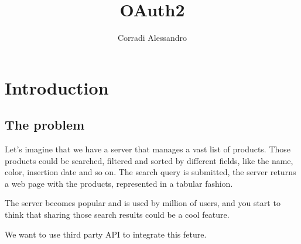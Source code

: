 \documentclass{style}
\title{OAuth2}
\author{Corradi Alessandro}
\begin{document}
\maketitle{}
\tableofcontents
\clearpage
{}

\section{Introduction}
\subsection{The problem}
Let's imagine that we have a server that manages a vast list of products.
Those products could be searched, filtered and sorted by different fields, like the name, color, insertion date and so on.
The search query is submitted, the server returns a web page with the products, represented in a tabular fashion.

The server becomes popular and is used by million of users, and you start to think that sharing those search results
could be a cool feature.

We want to use third party API to integrate this feture.
\end{document}
